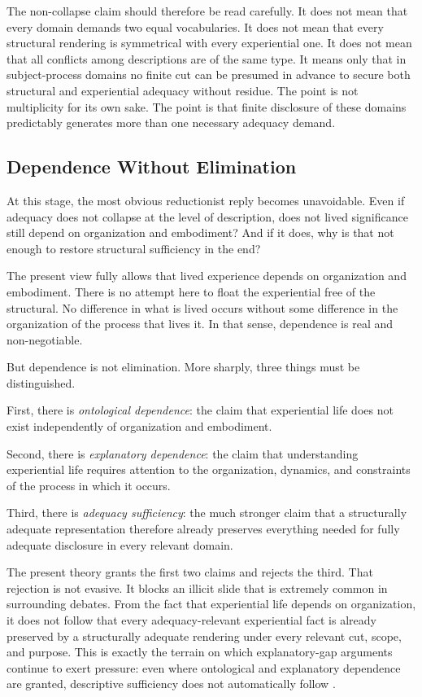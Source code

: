 \documentclass[11pt]{article}
\renewcommand{\emph}[1]{\textit{#1}}
\begin{document}
The non-collapse claim should therefore be read carefully. It does not mean that every domain demands two equal vocabularies. It does not mean that every structural rendering is symmetrical with every experiential one. It does not mean that all conflicts among descriptions are of the same type. It means only that in subject-process domains no finite cut can be presumed in advance to secure both structural and experiential adequacy without residue. The point is not multiplicity for its own sake. The point is that finite disclosure of these domains predictably generates more than one necessary adequacy demand.

\subsection{Dependence Without Elimination}

At this stage, the most obvious reductionist reply becomes unavoidable. Even if adequacy does not collapse at the level of description, does not lived significance still depend on organization and embodiment? And if it does, why is that not enough to restore structural sufficiency in the end?

The present view fully allows that lived experience depends on organization and embodiment. There is no attempt here to float the experiential free of the structural. No difference in what is lived occurs without some difference in the organization of the process that lives it. In that sense, dependence is real and non-negotiable.

But dependence is not elimination. More sharply, three things must be distinguished.

First, there is \emph{ontological dependence}: the claim that experiential life does not exist independently of organization and embodiment.

Second, there is \emph{explanatory dependence}: the claim that understanding experiential life requires attention to the organization, dynamics, and constraints of the process in which it occurs.

Third, there is \emph{adequacy sufficiency}: the much stronger claim that a structurally adequate representation therefore already preserves everything needed for fully adequate disclosure in every relevant domain.

The present theory grants the first two claims and rejects the third. That rejection is not evasive. It blocks an illicit slide that is extremely common in surrounding debates. From the fact that experiential life depends on organization, it does not follow that every adequacy-relevant experiential fact is already preserved by a structurally adequate rendering under every relevant cut, scope, and purpose. This is exactly the terrain on which explanatory-gap arguments continue to exert pressure: even where ontological and explanatory dependence are granted, descriptive sufficiency does not automatically follow \cite{Levine1983,Chalmers1995}.
\end{document}
